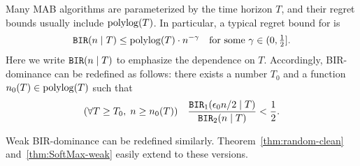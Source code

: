 Many MAB algorithms are parameterized by the time horizon $T$, and their regret bounds usually include $\polylog(T)$. In particular,  a typical regret bound for \BIR is
\begin{align}
    \BIR(n\mid T)\leq \polylog(T)\cdot n^{-\gamma}
    \quad \text{for some $\gamma\in(0,\tfrac12]$}.
\end{align}
Here we write $\mathtt{BIR}(n\mid T)$ to emphasize the dependence on $T$. Accordingly, BIR-dominance can be redefined as follows: there exists a number $T_0$ and a function $n_0(T)\in \polylog(T)$
such that
\begin{align}\label{eq:random-better-messy}
(\forall T\geq T_0,\; n\geq n_0(T)) \quad
\frac{\mathtt{BIR}_1(\epsilon_0 n /2\mid T)}{\mathtt{BIR}_2(n\mid T)} <\frac12.
\end{align}

\noindent Weak BIR-dominance can be redefined similarly.
Theorem~\ref{thm:random-clean} and~\ref{thm:SoftMax-weak} easily extend to these versions.







